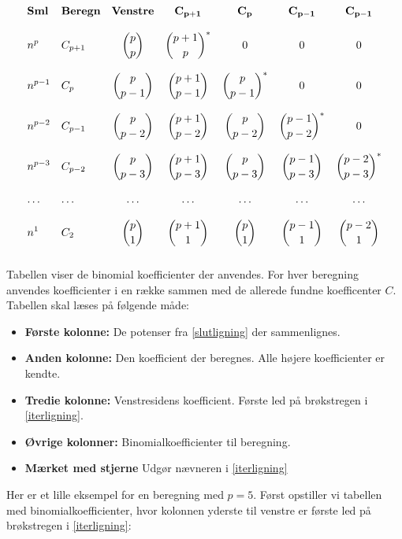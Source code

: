 \begin{equation*}
\begin{array}{>{\displaystyle}l>{\displaystyle}l>{\displaystyle}c>{\displaystyle}c>{\displaystyle}c>{\displaystyle}c>{\displaystyle}c}
\textbf{Sml}	&\textbf{Beregn}&\textbf{Venstre}	&\mathbf{C_{p+1}}	&\mathbf{C_{p}}	&\mathbf{C_{p-1}}&\mathbf{C_{p-1}}\\\\
n^{p}		&C_{p+1}	& \binom{p}{p} 	&{\binom{p+1}{p}}^*&0&0&0\\\\
n^{p-1}	&C_{p}	& \binom{p}{p-1} 	&\binom{p+1}{p-1} 	&{\binom{p}{p-1}}^*&0&0\\\\
n^{p-2}	&C_{p-1}	& \binom{p}{p-2}	&\binom{p+1}{p-2} 	&\binom{p}{p-2}&{\binom{p-1}{p-2}}^*&0\\\\
n^{p-3}	&C_{p-2}	& \binom{p}{p-3} 	&\binom{p+1}{p-3} 	&\binom{p}{p-3}&\binom{p-1}{p-3}&{\binom{p-2}{p-3}}^*\\\\
\dotsc 		&\dotsc 	& \dotsc 		&\dotsc 		&\dotsc&\dotsc&\dotsc\\\\
n^1 		&C_{2}	& \binom{p}{1} 	&\binom{p+1}{1} 	&\binom{p}{1}&\binom{p-1}{1}&\binom{p-2}{1}\\\\
\end{array}
\end{equation*}
Tabellen viser de binomial koefficienter der anvendes. For hver beregning anvendes koefficienter i en række sammen med de allerede fundne koefficenter \(C\). Tabellen skal læses på følgende måde:
\begin{itemize}
\item {\bf Første kolonne:} De potenser fra \ref{slutligning} der sammenlignes.
\item {\bf Anden kolonne:} Den koefficient der beregnes. Alle højere koefficienter er kendte.
\item {\bf Tredie kolonne:} Venstresidens koefficient. Første led på brøkstregen i \ref{iterligning}.
\item {\bf Øvrige kolonner:} Binomialkoefficienter til beregning.
\item {\bf Mærket med stjerne} Udgør nævneren i \ref{iterligning} 
\end{itemize}
Her er et lille eksempel for en beregning med \(p=5\). Først opstiller vi tabellen med binomialkoefficienter, hvor kolonnen yderste til venstre er første led på brøkstregen i \ref{iterligning}:
